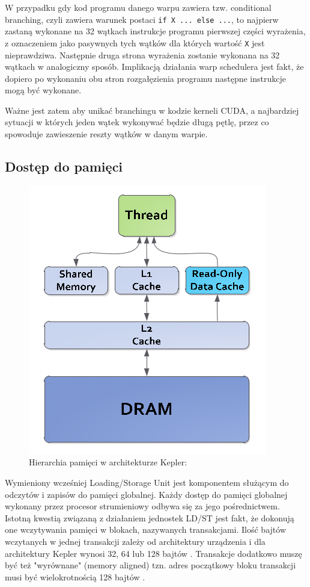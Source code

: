W przypadku gdy kod programu danego warpu zawiera tzw. conditional branching,
  czyli zawiera warunek postaci \texttt{if X {...} else {...}}, to najpierw
  zastaną wykonane na 32 wątkach instrukcje programu pierwszej części wyrażenia,
  z oznaczeniem jako pasywnych tych wątków dla których wartość \texttt{X} jest
  nieprawdziwa. Następnie druga strona wyrażenia zostanie wykonana na 32 wątkach
  w analogiczny sposób. Implikacją działania warp schedulera jest fakt, że
  dopiero po wykonaniu obu stron rozgałęzienia programu następne instrukcje mogą
  być wykonane. 
  
Ważne jest zatem aby unikać branchingu w kodzie kerneli CUDA, a
najbardziej sytuacji w których jeden wątek wykonywać będzie długą pętlę, przez
co spowoduje zawieszenie reszty wątków w danym warpie.

\subsection{Dostęp do pamięci}

\begin{figure}[ht]
\centering
\includegraphics[scale=0.4]{images/memory-hierarchy2.png}
\caption{Hierarchia pamięci w architekturze Kepler: \cite{kepler}}
\label{hierarchiaKepler}
\end{figure}

Wymieniony wcześniej Loading/Storage Unit jest komponentem służącym do odczytów
i zapisów do pamięci globalnej. Każdy dostęp do pamięci globalnej wykonany przez
procesor strumieniowy odbywa się za jego pośrednictwem. Istotną kwestią związaną
z działaniem jednostek LD/ST jest fakt, że dokonują one wczytywania pamięci w
blokach, nazywanych transakcjami. Ilość bajtów wczytanych w jednej transakcji
zależy od architektury urządzenia i dla architektury Kepler wynosi 32, 64 lub
128 bajtów \cite{Nvi11b}. Transakcje dodatkowo muszę być też "wyrównane" (memory
		aligned) tzn. adres początkowy bloku transakcji musi być wielokrotnością
128 bajtów \cite{Nvi11b}.

